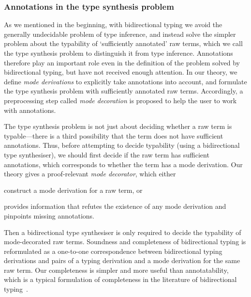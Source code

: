 \subsubsection{Annotations in the type synthesis problem}

As we mentioned in the beginning, with bidirectional typing we avoid the generally undecidable problem of type inference, and instead solve the simpler problem about the typability of `sufficiently annotated' raw terms, which we call the type synthesis problem to distinguish it from type inference.
Annotations therefore play an important role even in the definition of the problem solved by bidirectional typing, but have not received enough attention.
In our theory, we define \emph{mode derivations} to explicitly take annotations into account, and formulate the type synthesis problem with sufficiently annotated raw terms.
Accordingly, a preprocessing step called \emph{mode decoration} is proposed to help the user to work with annotations.

The type synthesis problem is not just about deciding whether a raw term is typable---there is a third possibility that the term does not have sufficient annotations.
Thus, before attempting to decide typability (using a bidirectional type synthesiser), we should first decide if the raw term has sufficient annotations, which corresponds to whether the term has a mode derivation.
Our theory gives a proof-relevant \emph{mode decorator}, which either
\begin{inlineenum}
  \item construct a mode derivation for a raw term, or
  \item provides information that refutes the existence of any mode derivation and pinpoints missing annotations.
\end{inlineenum}
Then a bidirectional type synthesiser is only required to decide the typability of mode-decorated raw terms.
Soundness and completeness of bidirectional typing is reformulated as a one-to-one correspondence between bidirectional typing derivations and pairs of a typing derivation and a mode derivation for the same raw term.
Our completeness is simpler and more useful than annotatability, which is a typical formulation of completeness in the literature of bidirectional typing~\cite[Section~3.2]{Dunfield2021}.


